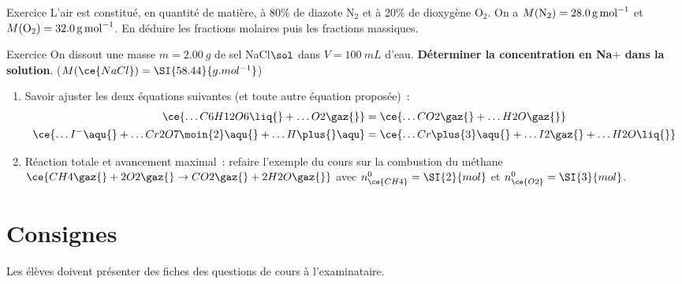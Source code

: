 \documentclass[a4paper, 12pt, final, garamond]{book}
\begin{document}
\begin{tcbraster}[raster columns=2, raster equal height=rows]
    \begin{NCexem}[width=\linewidth]{Exercice}
        L'air est constitué, en quantité de matière, à 80\% de diazote N$_2$ et
        à 20\% de dioxygène O$_2$. On a $M({\rm N_2}) = \SI{28.0}{g.mol^{-1}}$
        et $M({\rm O_2}) = \SI{32.0}{g.mol^{-1}}$. En déduire les fractions
        molaires puis les fractions massiques.
    \end{NCexem}
    \begin{NCexem}[]{Exercice}
        On dissout une masse $m = \SI{2.00}{g}$ de sel NaCl$\sol$ dans $V =
        \SI{100}{mL}$ d'eau. \textbf{Déterminer la concentration en
        Na$\plus{}$ dans la solution}. ($M(\ce{NaCl}) = \SI{58.44}{g.mol^{-1}}$)
    \end{NCexem}
\end{tcbraster}
\begin{enumerate}[resume]
    \item Savoir ajuster les deux équations suivantes (et toute autre équation
        proposée)~:
        \begin{align*}
            \ce{\ldots C6H12O6\liq{} + \ldots O2\gaz{}}
            &=
            \ce{\ldots CO2\gaz{} + \ldots H2O\gaz{}}\\
            \ce{\ldots I^-\aqu{} + \ldots Cr2O7\moin{2}\aqu{} + \ldots H\plus{}\aqu}
            &=
            \ce{\ldots Cr\plus{3}\aqu{} + \ldots I2\gaz{} + \ldots H2O\liq{}}
        \end{align*}

    \item Réaction totale et avancement maximal~: refaire l'exemple du cours sur
        la combustion du méthane $\ce{CH4\gaz{} + 2O2\gaz{} \rightarrow
        CO2\gaz{} + 2H2O\gaz{}}$ avec $n_{\ce{CH4}}^0 = \SI{2}{mol}$ et
        $n_{\ce{O2}}^0 = \SI{3}{mol}$.
\end{enumerate}

\section{Consignes}
\begin{framed}
    \begin{center}
        \Huge Les élèves doivent présenter des fiches des
        questions de cours à l'examinataire.
    \end{center}
\end{framed}
\end{document}
